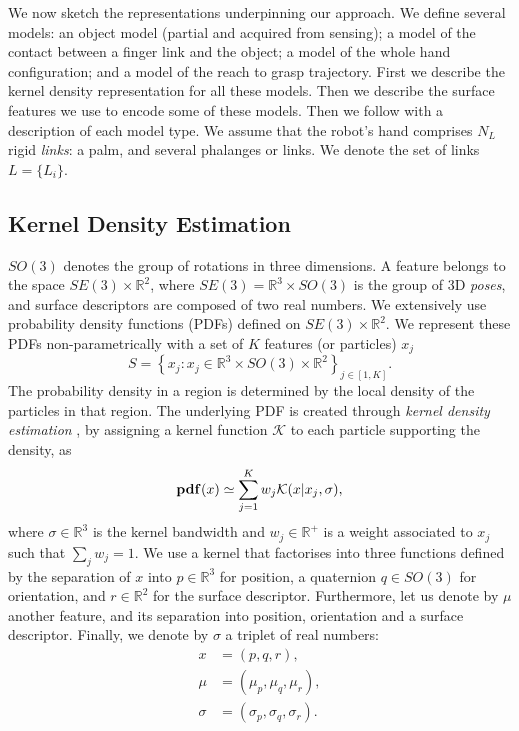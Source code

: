 We now sketch the representations underpinning our approach. We define several models: an object model (partial and acquired from sensing); a model of the contact between a finger link and the object; a model of the whole hand configuration; and a model of the reach to grasp trajectory. First we describe the kernel density representation for all these models. Then we describe the surface features we use to encode some of these models. Then we follow with a description of each model type. We assume that the robot's hand comprises $N_L$ rigid \emph{links}: a palm, and several phalanges or links. We denote the set of links $L =\{L_i\}$.

\subsection{Kernel Density Estimation}
\label{sec:kde}
$SO(3)$ denotes the group of rotations in three dimensions. A feature belongs to the space $SE(3) \times \mathbb R^2$, where $SE(3) = \mathbb R^3 \times SO(3)$ is the group of 3D \emph{poses}, and surface descriptors are composed of two real numbers. We extensively use probability density functions (PDFs) defined on $SE(3) \times \mathbb R^2$.  We represent these PDFs non-parametrically with a set of $K$ features (or particles) $x_j$
\begin{equation}
S = \left\lbrace x_j : x_j \in \mathbb R^3 \times SO(3) \times \mathbb R^2 \right\rbrace_{j \in [1,K]}.
\end{equation}
The probability density in a region is determined by the local density of the particles in that region. The underlying PDF is created through \emph{kernel density estimation} \cite{silverman1986a}, by assigning a kernel function $\mathcal{K}$ to each particle supporting the density, as
\begin{equation}\label{eq:d}
\mathbf{pdf}(x) \simeq \sum_{j=1}^K w_j \mathcal{K}(x| x_{j}, \sigma),
\end{equation}
where  $\sigma \in \mathbb R^3$ is the kernel bandwidth and $w_j \in \mathbb R^{+}$ is a weight associated to $x_j$ such that $\sum_j w_j = 1$. We use a kernel that factorises into three functions defined by the separation of $x$ into $p \in \mathbb R^3$ for position, a quaternion $q \in SO(3)$ for orientation, and $r \in \mathbb R^2$ for the surface descriptor. Furthermore, let us denote by $\mu$ another feature, and its separation into position, orientation and a surface descriptor. Finally, we denote by $\sigma$ a triplet of real numbers:
\begin{subequations}
\begin{align}
x &= (p, q, r),\\
\mu &= (\mu_p, \mu_q, \mu_r),\\
\sigma &= (\sigma_p, \sigma_q, \sigma_r).
\end{align}
\label{eq:feature}
\end{subequations}
